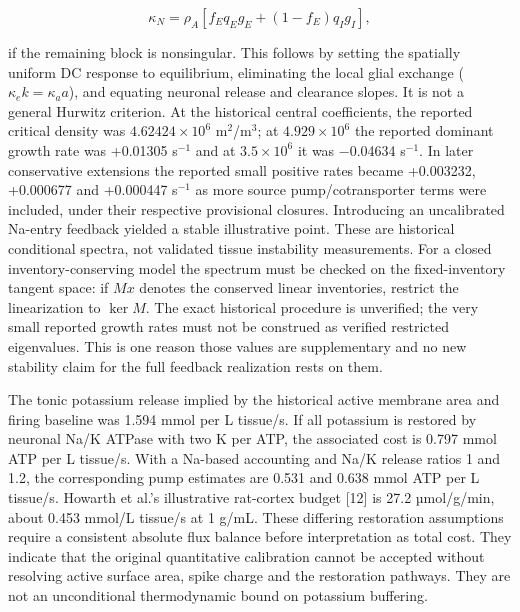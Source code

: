\documentclass[
  11pt,
]{article}
\begin{document}
\[\kappa_N=\rho_A[f_Eq_Eg_E+(1-f_E)q_Ig_I],\]

if the remaining block is nonsingular. This follows by setting the
spatially uniform DC response to equilibrium, eliminating the local
glial exchange (\(\kappa_e k=\kappa_a a\)), and equating neuronal
release and clearance slopes. It is not a general Hurwitz criterion. At
the historical central coefficients, the reported critical density was
\(4.62424\times10^6\) m\(^2\)/m\(^3\); at \(4.929\times10^6\) the
reported dominant growth rate was +0.01305 s\(^{-1}\) and at
\(3.5\times10^6\) it was −0.04634 s\(^{-1}\). In later conservative
extensions the reported small positive rates became +0.003232, +0.000677
and +0.000447 s\(^{-1}\) as more source pump/cotransporter terms were
included, under their respective provisional closures. Introducing an
uncalibrated Na-entry feedback yielded a stable illustrative point.
These are historical conditional spectra, not validated tissue
instability measurements. For a closed inventory-conserving model the
spectrum must be checked on the fixed-inventory tangent space: if
\(M x\) denotes the conserved linear inventories, restrict the
linearization to \(\ker M\). The exact historical procedure is
unverified; the very small reported growth rates must not be construed
as verified restricted eigenvalues. This is one reason those values are
supplementary and no new stability claim for the full feedback
realization rests on them.

The tonic potassium release implied by the historical active membrane
area and firing baseline was 1.594 mmol per L tissue/s. If all potassium
is restored by neuronal Na/K ATPase with two K per ATP, the associated
cost is 0.797 mmol ATP per L tissue/s. With a Na-based accounting and
Na/K release ratios 1 and 1.2, the corresponding pump estimates are
0.531 and 0.638 mmol ATP per L tissue/s. Howarth et al.'s illustrative
rat-cortex budget {[}12{]} is 27.2 µmol/g/min, about 0.453 mmol/L
tissue/s at 1 g/mL. These differing restoration assumptions require a
consistent absolute flux balance before interpretation as total cost.
They indicate that the original quantitative calibration cannot be
accepted without resolving active surface area, spike charge and the
restoration pathways. They are not an unconditional thermodynamic bound
on potassium buffering.
\end{document}
